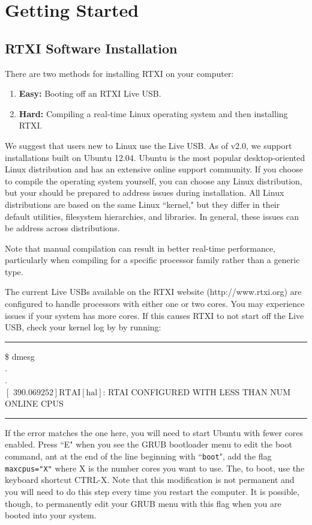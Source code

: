\chapter{Getting Started}

\section{RTXI Software Installation}
There are two methods for installing RTXI on your computer:
\begin{enumerate}
\item \textbf{Easy:} Booting off an RTXI Live USB.
\item \textbf{Hard:} Compiling a real-time Linux operating system and then installing RTXI.
\end{enumerate}


We suggest that users new to Linux use the Live USB. As of v2.0, we support installations built on Ubuntu 12.04. Ubuntu is the most popular desktop-oriented Linux distribution and has an extensive online support community. If you choose to compile the operating system yourself, you can choose any Linux distribution, but your should be prepared to address issues during installation. All Linux distributions are based on the same Linux ``kernel," but they differ in their default utilities, filesystem hierarchies, and libraries. In general, these issues can be address across distributions. 

Note that manual compilation can result in better real-time performance, particularly when compiling for a specific processor family rather than a generic type. 

\attention
The current Live USBs available on the RTXI website (http://www.rtxi.org) are configured to handle processors with either one or two cores. You may experience issues if your system has more cores. If this causes RTXI to not start off the Live USB, check your kernel log by by running:
\bigskip
\begin{example}
\hrule\bigskip
\$ dmesg\\
.\\
.\\
$\left[\textrm{ 390.069252}\right] \textrm{RTAI}\left[\textrm{hal}\right]$: RTAI CONFIGURED WITH LESS THAN NUM ONLINE CPUS
\bigskip
\hrule\bigskip
\end{example}

If the error matches the one here, you will need to start Ubuntu with fewer cores enabled. Press ``E" when you see the GRUB bootloader menu to edit the boot command, ant at the end of the line beginning with ``\texttt{boot}", add the flag \texttt{maxcpus="X"} where X is the number cores you want to use. The, to boot, use the keyboard shortcut CTRL-X. Note that this modification is not permanent and you will need to do this step every time you restart the computer. It is possible, though, to permanently edit your GRUB menu with this flag when you are booted into your system.